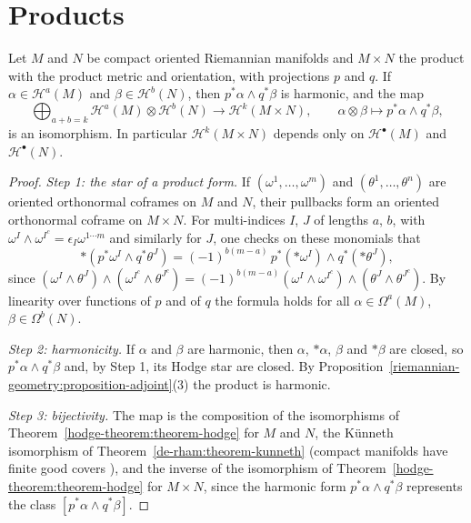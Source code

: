 \section{Products}\label{hodge-theorem:section-products}

\begin{proposition}\label{hodge-theorem:proposition-products}
Let $M$ and $N$ be compact oriented Riemannian manifolds and $M \times N$ the product with the product metric and orientation, with projections $p$ and $q$. If $\alpha \in \mathcal{H}^a(M)$ and $\beta \in \mathcal{H}^b(N)$,
then $p^*\alpha \wedge q^*\beta$ is harmonic, and the map
\[
\bigoplus_{a+b=k}\mathcal{H}^a(M) \otimes \mathcal{H}^b(N) \to \mathcal{H}^k(M \times N), \qquad \alpha \otimes \beta \mapsto p^*\alpha \wedge q^*\beta,
\]
is an isomorphism. In particular $\mathcal{H}^k(M \times N)$ depends only on $\mathcal{H}^\bullet(M)$ and $\mathcal{H}^\bullet(N)$.
\end{proposition}

\begin{proof}
\emph{Step 1: the star of a product form.} If $(\omega^1, \ldots, \omega^m)$ and $(\theta^1, \ldots, \theta^{n})$ are oriented orthonormal coframes on $M$ and $N$, their pullbacks form an oriented orthonormal coframe on
$M \times N$. For multi-indices $I$, $J$ of lengths $a$, $b$, with $\omega^I \wedge \omega^{I^c} = \epsilon_I\omega^{1\cdots m}$ and similarly for $J$, one checks on these monomials that
\[
*(p^*\omega^I \wedge q^*\theta^J) = (-1)^{b(m - a)}\,p^*(*\omega^I) \wedge q^*(*\theta^J),
\]
since $(\omega^I \wedge \theta^J) \wedge (\omega^{I^c} \wedge \theta^{J^c}) = (-1)^{b(m-a)}(\omega^I \wedge \omega^{I^c}) \wedge (\theta^J \wedge \theta^{J^c})$. By linearity over functions of $p$ and of $q$ the formula holds for all
$\alpha \in \Omega^a(M)$, $\beta \in \Omega^b(N)$.

\emph{Step 2: harmonicity.} If $\alpha$ and $\beta$ are harmonic, then $\alpha$, $*\alpha$, $\beta$ and $*\beta$ are closed, so $p^*\alpha \wedge q^*\beta$ and, by Step 1, its Hodge star are closed. By
Proposition~\ref{riemannian-geometry:proposition-adjoint}(3) the product is harmonic.

\emph{Step 3: bijectivity.} The map is the composition of the isomorphisms of Theorem~\ref{hodge-theorem:theorem-hodge} for $M$ and $N$, the K\"unneth isomorphism of Theorem~\ref{de-rham:theorem-kunneth} (compact
manifolds have finite good covers \cite[Chapter I, Section 5]{bott-tu}), and the inverse of the isomorphism of Theorem~\ref{hodge-theorem:theorem-hodge} for $M \times N$, since the harmonic form
$p^*\alpha \wedge q^*\beta$ represents the class $[p^*\alpha \wedge q^*\beta]$.
\end{proof}

